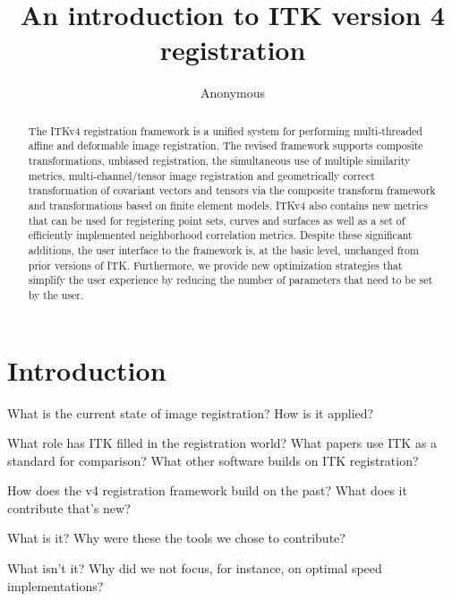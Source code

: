 \documentclass{article}
\begin{document}
\vspace{-0.1in}
\title{An introduction to ITK version 4 registration}
\author{Anonymous}
\maketitle              
\begin{abstract}
The ITKv4 registration framework is a unified system for performing
multi-threaded affine and deformable image registration.  The revised
framework supports composite transformations, unbiased registration,
the simultaneous use of multiple similarity metrics,
multi-channel/tensor image registration and geometrically correct
transformation of covariant vectors and tensors via the composite
transform framework and transformations based on finite element
models.  ITKv4 also contains new metrics that can be used for
registering point sets, curves and surfaces as well as a set of
efficiently implemented neighborhood correlation metrics.  Despite
these significant additions, the user interface to the framework is,
at the basic level, unchanged from prior versions of ITK.
Furthermore, we provide new optimization strategies that simplify the
user experience by reducing the number of parameters that need to be
set by the user.
\end{abstract}

\section{Introduction}
What is the current state of image registration?  How is it applied?

What role has ITK filled in the registration world?  What papers use
ITK as a standard for comparison?  What other software builds on ITK registration?

How does the v4 registration framework build on the past?  What does
it contribute that's new?  

What is it? Why were these the tools we chose to contribute?  

What isn't it? Why did we not focus, for instance, on optimal speed implementations?



\end{document}
